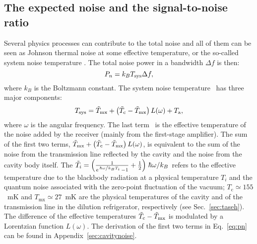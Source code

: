 \subsection{The expected noise and the signal-to-noise ratio}
\label{sec:intronoise}
Several physics processes can contribute to the total noise and all of them 
can be seen as Johnson thermal noise at some effective temperature, or the 
so-called system noise temperature \tsys. The total noise power in a 
bandwidth $\Delta f$ is then:
\begin{equation}
  P_n = k_BT_\text{sys} \Delta f, 
\end{equation}
where $k_B$ is the Boltzmann constant. 
The system noise temperature \tsys\ has three major components: 
\begin{equation}
 T_\text{sys} = \Tilde{T}_\text{mx} + \left(\Tilde{T}_\text{c}-\Tilde{T}_\text{mx}\right)L(\omega) + T_\text{a},
\label{eq:pn}
\end{equation}
where $\omega$ is the angular frequency. 
The last term \ta\ is the effective temperature of the 
noise added by the receiver (mainly from the first-stage amplifier). 
The sum of the first two terms, 
$\Tilde{T}_\text{mx} + \left(\Tilde{T}_\text{c}-\Tilde{T}_\text{mx}\right)L(\omega)$, is equivalent 
to the sum of the noise from the transmission line reflected by the cavity 
and the noise from the cavity body itself. 
The 
$\Tilde{T}_i=\left(\frac{1}{e^{\left.\hbar\omega\middle/k_BT_i\right.}-1} + \frac{1}{2}\right)\left. \hbar\omega\middle/k_B\right.$ refers to  
the effective temperature due to 
the blackbody radiation at a physical temperature $T_i$ and         
the quantum noise associated with the zero-point fluctuation of the vacuum; 
$T_\text{c}\simeq155$~mK and $T_\text{mx}\simeq27$~mK are the physical 
temperatures of the cavity and of the transmission line in the dilution 
refrigerator, respectively (see Sec.~\ref{sec:taseh}). The difference 
of the effective temperatures $\Tilde{T}_\text{c}-\Tilde{T}_\text{mx}$ is 
modulated by a Lorentzian function $L(\omega)$. 
The derivation of the first two terms in Eq.~\eqref{eq:pn} can be found in 
Appendix~\ref{sec:cavitynoise}. 
